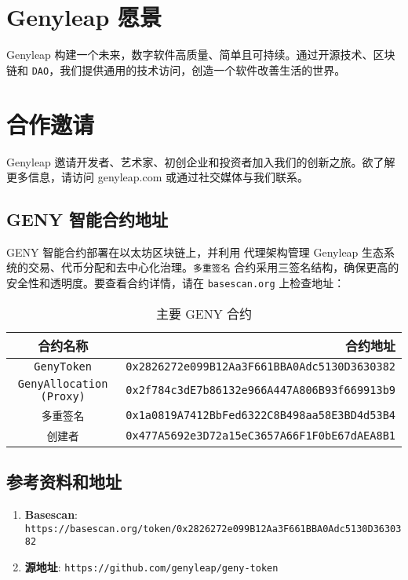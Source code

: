 \documentclass[a4paper,12pt,openany]{book}
\begin{document}
\chapter{Genyleap 愿景}
Genyleap 构建一个未来，数字软件高质量、简单且可持续。通过开源技术、区块链和 \texttt{DAO}，我们提供通用的技术访问，创造一个软件改善生活的世界。

\chapter{合作邀请}
Genyleap 邀请开发者、艺术家、初创企业和投资者加入我们的创新之旅。欲了解更多信息，请访问 genyleap.com 或通过社交媒体与我们联系。

\section*{GENY 智能合约地址}
GENY 智能合约部署在以太坊区块链上，并利用  代理架构管理 Genyleap 生态系统的交易、代币分配和去中心化治理。\texttt{多重签名} 合约采用三签名结构，确保更高的安全性和透明度。要查看合约详情，请在 \texttt{basescan.org} 上检查地址：

\begin{table}[h]
\centering
\caption*{主要 GENY 合约}
\small
\begin{tabular}{c r}
\hline
\textbf{合约名称} & \textbf{合约地址} \\
\hline
\texttt{GenyToken} & {\texttt{0x2826272e099B12Aa3F661BBA0Adc5130D3630382}} \\
\texttt{GenyAllocation (Proxy)} & {\texttt{0x2f784c3dE7b86132e966A447A806B93f669913b9}} \\
\texttt{多重签名} & {\texttt{0x1a0819A7412BbFed6322C8B498aa58E3BD4d53B4}} \\
\texttt{创建者} & {\texttt{0x477A5692e3D72a15eC3657A66F1F0bE67dAEA8B1}} \\
\hline
\end{tabular}
\end{table}

\section*{参考资料和地址}

\begin{enumerate}
    \item \textbf{Basescan}: \texttt{https://basescan.org/token/0x2826272e099B12Aa3F661BBA0Adc5130D3630382}
    \item \textbf{源地址}: \texttt{https://github.com/genyleap/geny-token}
\end{enumerate}
\end{document}

